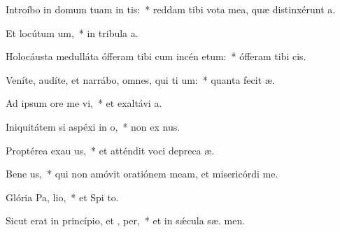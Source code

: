\item Introíbo in domum tuam in tis:~* reddam tibi vota mea, quæ distinxérunt  a.
\item Et locútum   um,~* in tribula a.
\item Holocáusta medulláta ófferam tibi cum incén etum:~* ófferam tibi   cis.
\item Veníte, audíte, et narrábo, omnes, qui ti um:~* quanta fecit  æ.
\item Ad ipsum ore me vi,~* et exaltávi   a.
\item Iniquitátem si aspéxi in  o,~* non ex nus.
\item Proptérea exau us,~* et atténdit voci depreca æ.
\item Bene us,~* qui non amóvit oratiónem meam, et misericórdi   me.
\item Glória Pa,  lio,~* et Spi to.
\item Sicut erat in princípio, et ,  per,~* et in sǽcula sæ. men.
